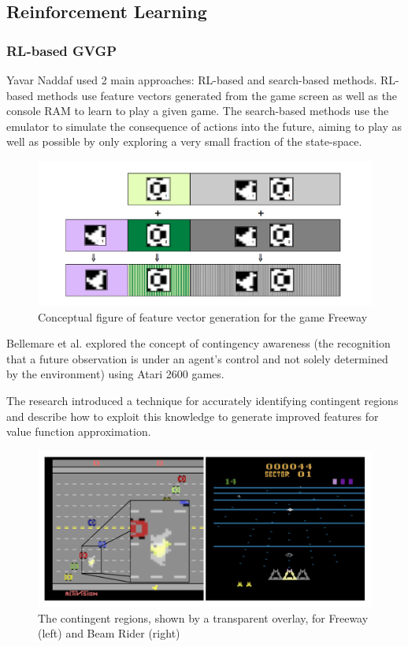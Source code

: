 \documentclass{beamer}
\begin{document}
\subsection{Reinforcement Learning}
\begin{frame}[allowframebreaks]
  \frametitle{RL-based GVGP}
  Yavar Naddaf \cite{6} used 2 main approaches: RL-based and search-based methods. RL-based methods use feature vectors generated from the game screen as well as the console RAM to learn to play a given game. The search-based methods use the emulator to simulate the consequence of actions into the future, aiming to play as well as possible by only exploring a very small fraction of the state-space.

  \begin{figure}
    \includegraphics[width=0.6\linewidth]{figures/featurevector}
    \caption{ Conceptual figure of feature vector generation for the game Freeway}
  \end{figure}

  Bellemare et al. \cite{7} explored the concept of contingency awareness (the recognition that a future observation is under an agent's control and not solely determined by the environment) using Atari 2600 games.

  The research introduced a technique for accurately identifying contingent regions and describe how to exploit this knowledge to generate improved features for value function approximation.
  \begin{figure}
    \includegraphics[width=0.5\linewidth]{figures/contingentregions}
    \caption{ The contingent regions, shown by a transparent overlay, for Freeway (left) and Beam Rider (right)}
  \end{figure}
\end{frame}
\end{document}
